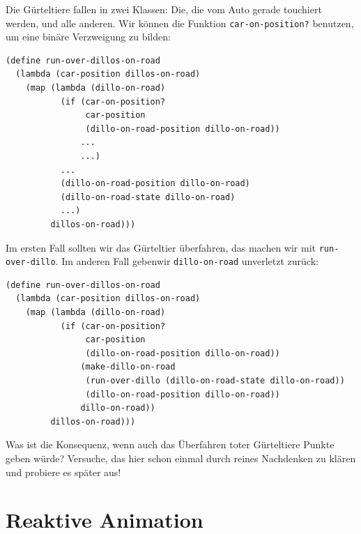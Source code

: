 %
Die Gürteltiere fallen in zwei Klassen: Die, die vom Auto gerade
touchiert werden, und alle anderen.  Wir können die Funktion
\lstinline{car-on-position?} benutzen, um eine binäre Verzweigung zu
bilden:
%
\begin{lstlisting}
(define run-over-dillos-on-road
  (lambda (car-position dillos-on-road)
    (map (lambda (dillo-on-road)
           (if (car-on-position?
                car-position
                (dillo-on-road-position dillo-on-road))
               ...
               ...)
           ...
           (dillo-on-road-position dillo-on-road)
           (dillo-on-road-state dillo-on-road)
           ...)
         dillos-on-road)))
\end{lstlisting}
%
Im ersten Fall sollten wir das Gürteltier überfahren, das machen wir
mit \lstinline{run-over-dillo}.  Im anderen Fall gebenwir
\lstinline{dillo-on-road} unverletzt zurück:
%
\begin{lstlisting}
(define run-over-dillos-on-road
  (lambda (car-position dillos-on-road)
    (map (lambda (dillo-on-road)
           (if (car-on-position?
                car-position
                (dillo-on-road-position dillo-on-road))
               (make-dillo-on-road
                (run-over-dillo (dillo-on-road-state dillo-on-road))
                (dillo-on-road-position dillo-on-road))
               dillo-on-road))
         dillos-on-road)))
\end{lstlisting}

\begin{aufgabeinline}
  Was ist die Konsequenz, wenn auch das Überfahren toter Gürteltiere
  Punkte geben würde?  Versuche, das hier schon einmal durch reines
  Nachdenken zu klären und probiere es später aus!
\end{aufgabeinline}

\section{Reaktive Animation}

